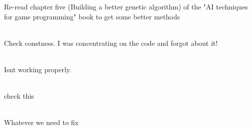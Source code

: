 \begin{DoxyRefList}
%
Re-\/read chapter five (Building a better genetic algorithm) of the "{}\+AI techniques for game programming"{} book to get some better methods  
\item[Class \doxylink{class_d_c_l_1_1_c_genome}{DCL\+::CGenome} ]\hfill \\
\label{todo__todo000001}%
%
Check constness. I was concentrating on the code and forgot about it!  
\item[Member \doxylink{class_d_c_l_1_1_c_image_ab86c42477271bcc981e19dccfb62e880}{DCL\+::CImage\+::greyscale} (float f\+Red\+Sensitivity=0.\+299f, float f\+Green\+Sensitivity=0.\+587f, float f\+Blue\+Sensitivity=0.\+144f)]\hfill \\
\label{todo__todo000006}%
%
Isn\textquotesingle{}t working properly.  
\item[Member \doxylink{class_d_c_l_1_1_c_oct_tree_a673d30946a9719b6e5df9bbb3041d287}{DCL\+::COct\+Tree\+::get\+Entities\+Within\+Frustum} (const \doxylink{class_d_c_l_1_1_c_frustum}{CFrustum} \&frustum) const]\hfill \\
\label{todo__todo000012}%
%
check this  
\item[Page \doxylink{03__doxygen_documentation}{Doxygen Documentation.} ]\hfill \\
\label{todo__todo000013}%
%
Whatever we need to fix
\end{DoxyRefList}